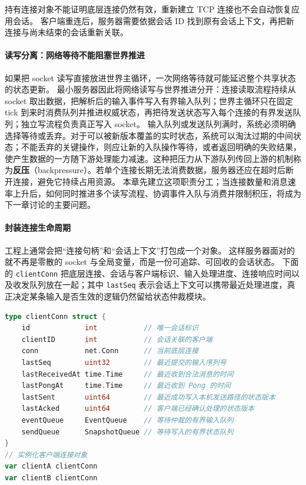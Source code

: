 持有连接对象不能证明底层连接仍然有效，重新建立 TCP 连接也不会自动恢复应用会话。
客户端重连后，服务器需要依据会话 ID 找到原有会话上下文，再把新连接与尚未结束的会话重新关联。

\paragraph{读写分离：网络等待不能阻塞世界推进}
如果把 socket 读写直接放进世界主循环，一次网络等待就可能延迟整个共享状态的状态更新。
最小服务器因此将网络读写与世界推进分开：连接读取流程持续从 socket 取出数据，把解析后的输入事件写入有界输入队列；世界主循环只在固定 tick 到来时消费队列并推进权威状态，再把待发送状态写入每个连接的有界发送队列；独立写流程负责真正写入 socket。
输入队列或发送队列满时，系统必须明确选择等待或丢弃。对于可以被新版本覆盖的实时状态，系统可以淘汰过期的中间状态；不能丢弃的关键操作，则应让新的入队操作等待，或者返回明确的失败结果，使产生数据的一方随下游处理能力减速。这种把压力从下游队列传回上游的机制称为\textbf{反压}（backpressure）。若单个连接长期无法消费数据，服务器还应在超时后断开连接，避免它持续占用资源。
本章先建立这项职责分工；当连接数量和消息速率上升后，如何同时推进多个读写流程、协调事件入队与消费并限制积压，将成为下一章讨论的主要问题。

\paragraph{封装连接生命周期}
工程上通常会把“连接句柄”和“会话上下文”打包成一个对象。
这样服务器面对的就不再是零散的 socket 与全局变量，而是一份可追踪、可回收的会话状态。
下面的 \texttt{clientConn} 把底层连接、会话与客户端标识、输入处理进度、连接响应时间以及收发队列放在一起；其中 \texttt{lastSeq} 表示会话上下文可以携带最近处理进度，真正决定某条输入是否生效的逻辑仍然留给状态仲裁模块。

\begin{tcolorbox}[title=连接管理的结构体定义]
\begin{lstlisting}[style=codeblock, language=go]
type clientConn struct {
    id             int           // 唯一会话标识
    clientID       int           // 会话关联的客户端
    conn           net.Conn      // 当前底层连接
    lastSeq        uint32        // 最近提交的输入序列号
    lastReceivedAt time.Time     // 最近收到合法消息的时间
    lastPongAt     time.Time     // 最近收到 Pong 的时间
    lastSent       uint64        // 最近成功写入本机发送路径的状态版本
    lastAcked      uint64        // 客户端已经确认处理的状态版本
    eventQueue     EventQueue    // 等待仲裁的有界输入队列
    sendQueue      SnapshotQueue // 等待写入的有界状态队列
}
// 实例化客户端连接对象
var clientA clientConn
var clientB clientConn
\end{lstlisting}
\end{tcolorbox}

